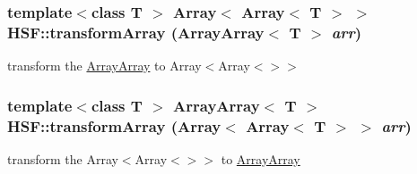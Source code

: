 \label{namespaceHSF_abc82617f6255755f345594061a46c88b}
\hypertarget{namespaceHSF_a7b24373b0b6c404063e4513af006bd77}{
\subsubsection[{transformArray}]{\setlength{\rightskip}{0pt plus 5cm}template$<$class T $>$ Array$<$ Array$<$ T $>$ $>$ HSF::transformArray (ArrayArray$<$ T $>$ {\em arr})}}
\label{namespaceHSF_a7b24373b0b6c404063e4513af006bd77}


transform the \hyperlink{classHSF_1_1ArrayArray}{ArrayArray} to Array$<$Array$<$$>$$>$ \hypertarget{namespaceHSF_a3160964f1c3812b1d7c9ba56328baed5}{
\subsubsection[{transformArray}]{\setlength{\rightskip}{0pt plus 5cm}template$<$class T $>$ {\bf ArrayArray}$<$ T $>$ HSF::transformArray (Array$<$ Array$<$ T $>$ $>$ {\em arr})}}
\label{namespaceHSF_a3160964f1c3812b1d7c9ba56328baed5}


transform the Array$<$Array$<$$>$$>$ to \hyperlink{classHSF_1_1ArrayArray}{ArrayArray} 